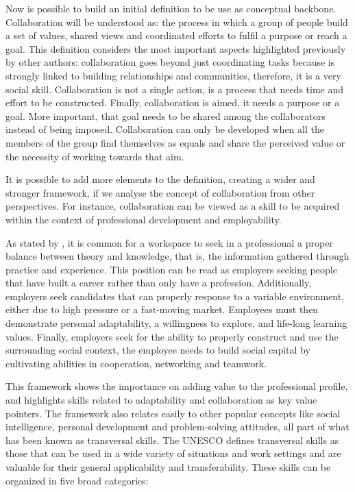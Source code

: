 Now is possible to build an initial definition to be use as conceptual backbone. Collaboration will be understood as: the process in which a group of people build a set of values, shared views
and coordinated efforts to fulfil a purpose or reach a goal. This definition considers the most important aspects highlighted previously by other authors: collaboration goes beyond just
coordinating tasks because is strongly linked to building relationships and communities, therefore, it is a very social skill. Collaboration is not a single action, is a process that needs time
and effort to be constructed. Finally, collaboration is aimed, it needs a purpose or a goal. More important, that goal needs to be shared among the collaborators instead of being imposed.
Collaboration can only be developed when all the members of the group find themselves as equals and share the perceived value or the necessity of working towards that aim.

It is possible to add more elements to the definition, creating a wider and stronger framework, if we analyse the concept of collaboration from other perspectives. For instance,
collaboration can be viewed as a skill to be acquired within the context of professional development and employability.

As stated by \textcite{crant_2000}, it is common for a workspace to seek in a professional a proper balance between theory and knowledge, that is, the information gathered through practice and
experience. This position can be read as employers seeking people that have built a career rather than only have a profession. Additionally, employers seek candidates that can properly response to a variable environment, either
due to high pressure or a fast-moving market. Employees must then demonstrate personal adaptability, a willingness to explore, and life-long learning values. Finally, employers seek for the ability
to properly construct and use the surrounding social context, the employee needs to build social capital by cultivating abilities in cooperation, networking and teamwork.

This framework shows the importance on adding value to the professional profile, and highlights skills related to adaptability and collaboration as key value pointers. The framework also relates
easily to other popular concepts like social intelligence, personal development and problem-solving attitudes, all part of what has been known as transversal skills. The UNESCO defines transversal
skills as those that can be used in a wide variety of situations and work settings \parencite{unesco_2014} and are valuable for their general applicability and transferability. These skills can be
organized in five broad categories:

